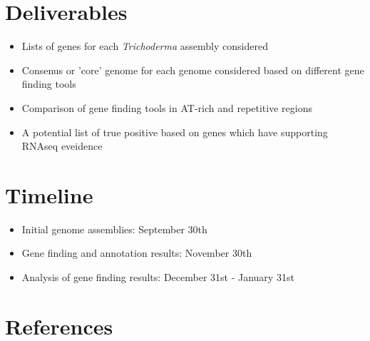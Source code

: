 \documentclass[12pt]{article}
\begin{document}
\section{Deliverables}
\begin{itemize}
\item Lists of genes for each \textit{Trichoderma} assembly considered
\item Consenus or 'core' genome for each genome considered based on
  different gene finding tools
\item Comparison of gene finding tools in AT-rich and repetitive regions
\item A potential list of true positive based on genes which have
  supporting RNAseq eveidence
\end{itemize}

\section{Timeline}
\begin{itemize}
\item Initial genome assemblies: September 30th
\item Gene finding and annotation results: November 30th
\item Analysis of gene finding results: December 31st - January 31st
\end{itemize}

\section{References}
\end{document}
